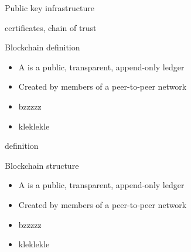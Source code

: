 \begin{frame}{Public key infrastructure}

certificates, chain of trust

\end{frame}

\begin{frame}{Blockchain definition}

\begin{itemize}
\item A  is a public, transparent,
append-only ledger
\item Created by members of a peer-to-peer
network
\item bzzzzz
\item kleklekle
\end{itemize}

definition
\end{frame}



\begin{frame}{Blockchain structure}

\begin{itemize}
\item A  is a public, transparent,
append-only ledger
\item Created by members of a peer-to-peer
network
\item bzzzzz
\item kleklekle
\end{itemize}

\end{frame}
